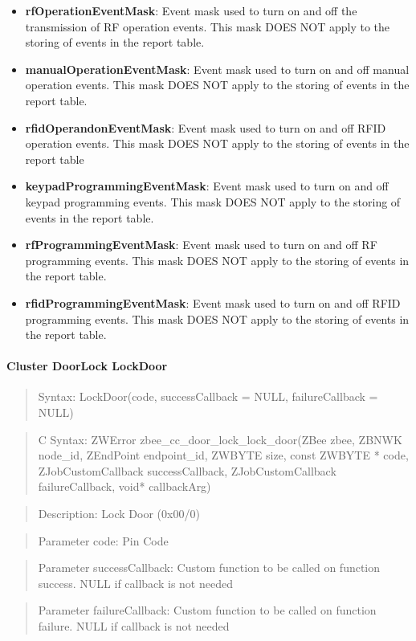 \begin{itemize}
\item \textbf{rfOperationEventMask}: Event mask used to turn on and off the transmission of RF operation events. This mask DOES NOT apply to the storing of events in the report table.
\item \textbf{manualOperationEventMask}: Event mask used to turn on and off manual operation events. This mask DOES NOT apply to the storing of events in the report table.
\item \textbf{rfidOperandonEventMask}: Event mask used to turn on and off RFID operation events. This mask DOES NOT apply to the storing of events in the report table
\item \textbf{keypadProgrammingEventMask}: Event mask used to turn on and off keypad programming events. This mask DOES NOT apply to the storing of events in the report table.
\item \textbf{rfProgrammingEventMask}: Event mask used to turn on and off RF programming events. This mask DOES NOT apply to the storing of events in the report table.
\item \textbf{rfidProgrammingEventMask}: Event mask used to turn on and off RFID programming events. This mask DOES NOT apply to the storing of events in the report table.
\end{itemize}

\paragraph{Cluster DoorLock LockDoor}
\begin{quote}Syntax: LockDoor(code, successCallback = NULL, failureCallback = NULL)\end{quote}
\begin{quote}C Syntax: ZWError zbee\_cc\_door\_lock\_lock\_door(ZBee zbee, ZBNWK node\_id, ZEndPoint endpoint\_id, ZWBYTE size, const ZWBYTE * code, ZJobCustomCallback successCallback, ZJobCustomCallback failureCallback, void* callbackArg)\end{quote}
\begin{quote}Description: Lock Door (0x00/0)\end{quote}
\begin{quote}Parameter code: Pin Code\end{quote}
\begin{quote}Parameter successCallback: Custom function to be called on function success. NULL if callback is not needed\end{quote}
\begin{quote}Parameter failureCallback: Custom function to be called on function failure. NULL if callback is not needed\end{quote}



